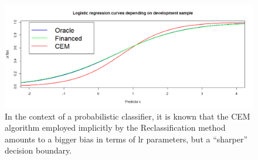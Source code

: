 \begin{figure}[ht]
\center \includegraphics[width=\textwidth]{figures/chapitre2/CEM_bias.png}
\caption{In the context of a probabilistic classifier, it is known that the CEM algorithm employed implicitly by the Reclassification method amounts to a bigger bias in terms of \gls{lr} parameters, but a ``sharper'' decision boundary.}
\label{fig:biais_CEM}
\end{figure}












